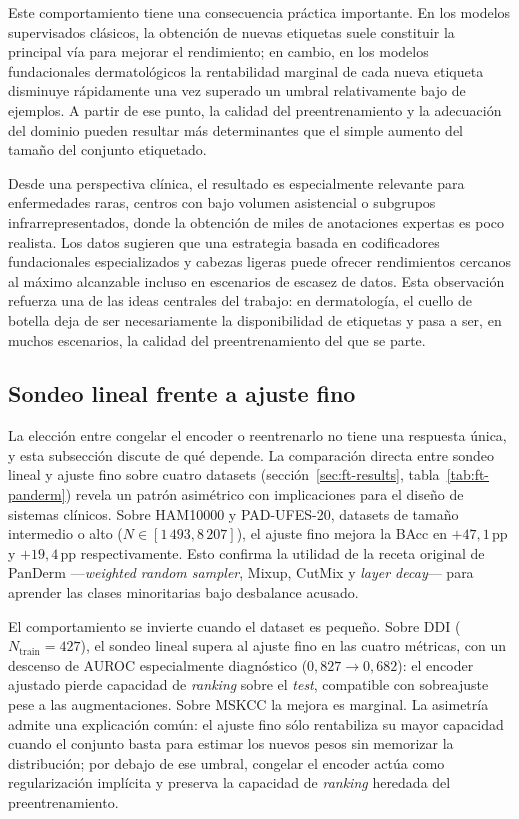 Este comportamiento tiene una consecuencia práctica importante. En los
modelos supervisados clásicos, la obtención de nuevas etiquetas suele
constituir la principal vía para mejorar el rendimiento; en cambio, en
los modelos fundacionales dermatológicos la rentabilidad marginal de
cada nueva etiqueta disminuye rápidamente una vez superado un umbral
relativamente bajo de ejemplos. A partir de ese punto, la calidad del
preentrenamiento y la adecuación del dominio pueden resultar más
determinantes que el simple aumento del tamaño del conjunto etiquetado.

Desde una perspectiva clínica, el resultado es especialmente relevante
para enfermedades raras, centros con bajo volumen asistencial o
subgrupos infrarrepresentados, donde la obtención de miles de
anotaciones expertas es poco realista. Los datos sugieren que una
estrategia basada en codificadores fundacionales especializados y
cabezas ligeras puede ofrecer rendimientos cercanos al máximo alcanzable
incluso en escenarios de escasez de datos. Esta observación refuerza una
de las ideas centrales del trabajo: en dermatología, el cuello de
botella deja de ser necesariamente la disponibilidad de etiquetas y pasa
a ser, en muchos escenarios, la calidad del preentrenamiento del que se
parte.

\subsection{Sondeo lineal frente a ajuste fino}
\label{sec:disc-lp-vs-ft}

La elección entre congelar el encoder o reentrenarlo no tiene una
respuesta única, y esta subsección discute de qué depende. La
comparación directa entre sondeo lineal y ajuste fino sobre cuatro
datasets (sección~\ref{sec:ft-results},
tabla~\ref{tab:ft-panderm}) revela un patrón asimétrico con
implicaciones para el diseño de sistemas clínicos. Sobre HAM10000 y
PAD-UFES-20, datasets de tamaño intermedio o alto
($N \in [1\,493, 8\,207]$), el ajuste fino mejora la BAcc en
$+47{,}1$\,pp y $+19{,}4$\,pp respectivamente. Esto confirma la
utilidad de la receta original de PanDerm ---\emph{weighted random
sampler}, Mixup, CutMix y \emph{layer decay}--- para aprender las
clases minoritarias bajo desbalance acusado.

El comportamiento se invierte cuando el dataset es pequeño. Sobre
DDI ($N_{\mathrm{train}} = 427$), el sondeo lineal supera al ajuste
fino en las cuatro métricas, con un descenso de AUROC
especialmente diagnóstico ($0{,}827 \to 0{,}682$): el encoder ajustado
pierde capacidad de \emph{ranking} sobre el \emph{test}, compatible con
sobreajuste pese a las augmentaciones. Sobre MSKCC la mejora es
marginal. La asimetría admite una explicación común: el ajuste fino
sólo rentabiliza su mayor capacidad cuando el conjunto basta para
estimar los nuevos pesos sin memorizar la distribución; por debajo de
ese umbral, congelar el encoder actúa como regularización implícita y
preserva la capacidad de \emph{ranking} heredada del preentrenamiento.

